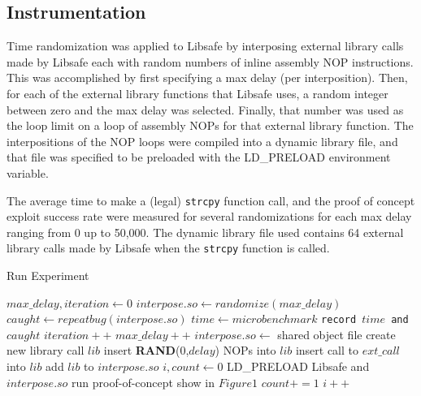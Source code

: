 \documentclass[letterpaper,twocolumn,10pt]{article}
\begin{document}
\subsection{Instrumentation \cite{Conrad2009}}
Time randomization was applied to Libsafe by interposing external library calls made by Libsafe each with random numbers of inline assembly NOP instructions.  This was accomplished by first specifying a max delay (per interposition).  Then, for each of the external library functions that Libsafe uses, a random integer between zero and the max delay was selected.  Finally, that number was used as the loop limit on a loop of assembly NOPs for that external library function.  The interpositions of the NOP loops were compiled into a dynamic library file, and that file was specified to be preloaded with the LD\_PRELOAD environment variable.

The average time to make a (legal) \texttt{strcpy} function call, and the proof of concept exploit success rate were measured for several randomizations for each max delay ranging from 0 up to 50,000.  The dynamic library file used contains 64 external library calls made by Libsafe when the \texttt{strcpy} function is called.

\begin{algorithm}
\caption{Run Experiment}
\begin{algorithmic}[1]
\State $max\_delay,iteration \gets 0$
		\State $interpose.so \gets randomize(max\_delay)$
		\State $caught \gets repeatbug(interpose.so)$
		\State $time \gets microbenchmark$
		\State \texttt{record $time$ and $caught$}
		\State $iteration++$
	\EndWhile
	\State $max\_delay++$
\EndWhile
\EndFunction
\State
{}
\State $interpose.so \gets$ shared object file
	\State create new library call $lib$
	\State insert \textbf{RAND}(0,$delay$) NOPs into $lib$
	\State insert call to $ext\_call$ into $lib$
	\State add $lib$ to $interpose.so$
\EndFor
\State {}
\EndFunction
\State
{}
\State $i,count \gets 0$
	\State LD\_PRELOAD Libsafe and $interpose.so$
	\State run proof-of-concept show in $Figure 1$
		\State $count += 1$
	\EndIf
	\State $i++$
\EndWhile
\State {}
\EndFunction
\end{algorithmic}
\end{algorithm}
\end{document}
